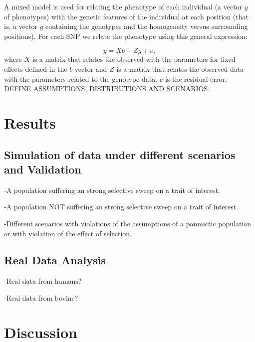 \documentclass[a4paper,11pt]{article}
\begin{document}
A mixed model is used for relating the phenotype of each individual (a vector $y$ of phenotypes) with the genetic features of the individual at each position (that is, a vector $g$ containing the genotypes and the homogeneity versus surrounding positions). For each SNP we relate the phenotype using this general expression:

 \begin{equation}
y = Xb + Zg + e ,
 \end{equation}
where $X$ is a matrix that relates the observed with the parameters for fixed effects defined in the $b$ vector and $Z$ is a matrix that relates the observed data with the parameters related to the genotype data. $e$ is the residual error. DEFINE ASSUMPTIONS, DISTRIBUTIONS  AND SCENARIOS.

\section{Results}
\subsection{Simulation of data under different scenarios and Validation}
\noindent -A  population suffering an strong selective sweep on a trait of interest.\par
\noindent -A  population NOT suffering an strong selective sweep on a trait of interest.\par
\noindent -Different scenarios with violations of the assumptions of a panmictic population or with violation of the effect of selection. %

\subsection{Real Data Analysis}
\noindent -Real data from humans?\par
\noindent -Real data from bovine?\par

\section{Discussion}


\newpage


\end{document}
